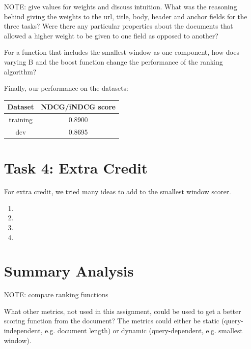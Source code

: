 \documentclass[10pt,twocolumn]{article}
\begin{document}
NOTE: give values for weights and discuss intuition.
What was the reasoning behind giving the weights to the url, title,
body, header and anchor fields for the three tasks? Were there any
particular properties about the documents that allowed a higher weight
to be given to one field as opposed to another?

For a function that includes the smallest window as one component,
how does varying B and the boost function change the performance
of the ranking algorithm?

Finally, our performance on the datasets:
\begin{table}[H]
\centering
\begin{tabular}{|c|c|}
\hline
Dataset & NDCG/iNDCG score \\\hline
training & 0.8900\\\hline
dev & 0.8695\\\hline
\end{tabular}
\end{table}

\section*{Task 4: Extra Credit}
For extra credit, we tried many ideas to add to the smallest window scorer.
\begin{enumerate}[(1)]
\item
\item
\item
\item

\end{enumerate}

\section*{Summary Analysis}
NOTE: compare ranking functions

What other metrics, not used in this assignment, could be used to
get a better scoring function from the document? The metrics could
either be static (query-independent, e.g. document length) or dynamic
(query-dependent, e.g. smallest window).
\end{document}
